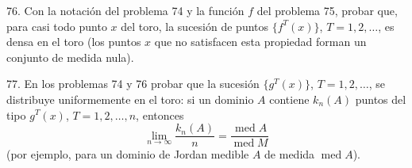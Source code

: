 \begin{problem}{76.}
	Con la notaci\'on del problema 74 y la funci\'on $f$ del problema 75, probar que, para casi todo punto $x$ del toro, la sucesi\'on de puntos $\{f^T (x)\}$, $T=1, 2, \dots$, es densa en el toro
	(los puntos $x$ que no satisfacen esta propiedad forman un conjunto de medida nula).
\end{problem}

\begin{problem}{77.}
	En los problemas 74 y 76 probar que la sucesi\'on $\{g^T (x)\}$, $T=1, 2, \dots$, se distribuye uniformemente en el toro:
	si un dominio $A$ contiene $k_n(A)$ puntos del tipo $ g^T (x) $,  $T=1, 2, \dots,n$, entonces
	\begin{equation*}
	\lim_{n \to \infty} \frac{k_n(A)}{n}=\frac{\operatorname{med} A}{\operatorname{med} M}
	\end{equation*}
	(por ejemplo, para un dominio de Jordan medible $A$ de medida $\operatorname{med} A$).
\end{problem}

\vfill

